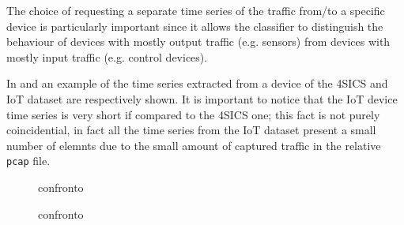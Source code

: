 The choice of requesting a separate time series of the traffic from/to a specific device is particularly important since it allows the classifier to distinguish the behaviour of devices with mostly output traffic (e.g. sensors) from devices with mostly input traffic (e.g. control devices).

In  and  an example of the time series extracted from a device of the 4SICS and IoT dataset are respectively shown. It is important to notice that the IoT device time series is very short if compared to the 4SICS one; this fact is not purely coincidential, in fact all the time series from the IoT dataset present a small number of elemnts due to the small amount of captured traffic in the relative \texttt{pcap} file.


\begin{figure}[h]
    \centering
    \begin{minipage}[c]{0.49\linewidth}
        \vspace{0pt}
        \centering
    \end{minipage}%
    \hfill%
    \begin{minipage}[c]{0.49\linewidth}
        \vspace{0pt}
        \centering
    \end{minipage}%
    \caption{confronto}
    \label{fig:ts_example_4sics}
\end{figure}


\begin{figure}[h]
    \centering
    \begin{minipage}[c]{0.49\linewidth}
        \vspace{0pt}
        \centering
    \end{minipage}%
    \hfill%
    \begin{minipage}[c]{0.49\linewidth}
        \vspace{0pt}
        \centering
    \end{minipage}%
    \caption{confronto}
    \label{fig:ts_example_iot}
\end{figure}



